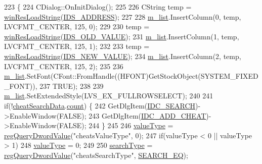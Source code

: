 \begin{DoxyCode}
223 \{
224   CDialog::OnInitDialog();
225   
226   CString temp = \mbox{\hyperlink{_win_res_util_8cpp_a416e85e80ab9b01376e87251c83d1a5a}{winResLoadString}}(\mbox{\hyperlink{resource_8h_a8c4c43573ba54b99f146c39eca3ef75d}{IDS\_ADDRESS}});
227 
228   \mbox{\hyperlink{class_g_b_a_cheat_search_aab4be5c0e3c3436c738a43f466be0902}{m\_list}}.InsertColumn(0, temp, LVCFMT\_CENTER, 125, 0);
229 
230   temp = \mbox{\hyperlink{_win_res_util_8cpp_a416e85e80ab9b01376e87251c83d1a5a}{winResLoadString}}(\mbox{\hyperlink{resource_8h_af732ffa656c552ce5c9865bde1c8f45a}{IDS\_OLD\_VALUE}});
231   \mbox{\hyperlink{class_g_b_a_cheat_search_aab4be5c0e3c3436c738a43f466be0902}{m\_list}}.InsertColumn(1, temp, LVCFMT\_CENTER, 125, 1);
232 
233   temp = \mbox{\hyperlink{_win_res_util_8cpp_a416e85e80ab9b01376e87251c83d1a5a}{winResLoadString}}(\mbox{\hyperlink{resource_8h_aa9cf1947b74bb2e7c2bd69d827145e75}{IDS\_NEW\_VALUE}});
234   \mbox{\hyperlink{class_g_b_a_cheat_search_aab4be5c0e3c3436c738a43f466be0902}{m\_list}}.InsertColumn(2, temp, LVCFMT\_CENTER, 125, 2);
235   
236   \mbox{\hyperlink{class_g_b_a_cheat_search_aab4be5c0e3c3436c738a43f466be0902}{m\_list}}.SetFont(CFont::FromHandle((HFONT)GetStockObject(SYSTEM\_FIXED\_FONT)),
237                  TRUE);
238 
239   \mbox{\hyperlink{class_g_b_a_cheat_search_aab4be5c0e3c3436c738a43f466be0902}{m\_list}}.SetExtendedStyle(LVS\_EX\_FULLROWSELECT);
240   
241   \textcolor{keywordflow}{if}(!\mbox{\hyperlink{_cheat_search_8cpp_aeeb4f5916a0f16b1bb45e57aa2cc58d4}{cheatSearchData}}.\mbox{\hyperlink{struct_cheat_search_data_a4c4d3092ddaff068d820c28067b15774}{count}}) \{
242     GetDlgItem(\mbox{\hyperlink{resource_8h_a8c4255e9c378282d679addf177c44b8f}{IDC\_SEARCH}})->EnableWindow(FALSE);
243     GetDlgItem(\mbox{\hyperlink{resource_8h_a37e53836b85277d7baf69ac54a0fd3e7}{IDC\_ADD\_CHEAT}})->EnableWindow(FALSE);
244   \}
245   
246   \mbox{\hyperlink{class_g_b_a_cheat_search_a633f5b523a814d3f1e4cb06b1799b798}{valueType}} = \mbox{\hyperlink{_reg_8cpp_a150640889ffff4851ee26d7b999ec7c3}{regQueryDwordValue}}(\textcolor{stringliteral}{"cheatsValueType"}, 0);
247   \textcolor{keywordflow}{if}(valueType < 0 || valueType > 1)
248     \mbox{\hyperlink{class_g_b_a_cheat_search_a633f5b523a814d3f1e4cb06b1799b798}{valueType}} = 0;
249 
250   \mbox{\hyperlink{class_g_b_a_cheat_search_a708b5bbf00916b2ff173eb07273b1db5}{searchType}} = \mbox{\hyperlink{_reg_8cpp_a150640889ffff4851ee26d7b999ec7c3}{regQueryDwordValue}}(\textcolor{stringliteral}{"cheatsSearchType"}, 
      \mbox{\hyperlink{_cheat_search_8h_a06fc87d81c62e9abb8790b6e5713c55ba234250b8584bedf460dbd7ead0c30e5f}{SEARCH\_EQ}});

\end{DoxyCode}
